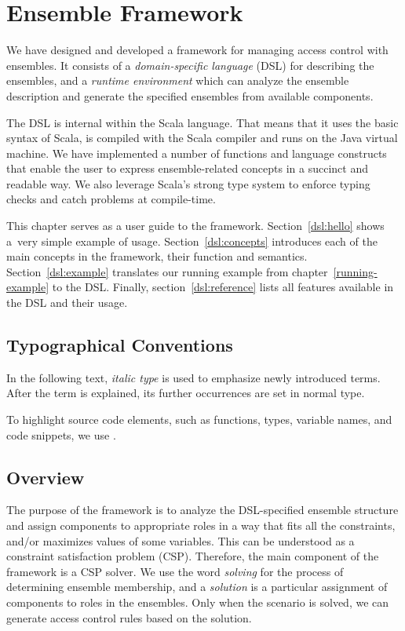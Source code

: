 \chapter{Ensemble Framework}
\label{dsl}

We have designed and developed a framework for managing access control with ensembles.
It consists of a \textit{domain-specific language} (DSL) for describing the ensembles,
and a \textit{runtime environment} which can analyze the ensemble description and
generate the specified ensembles from available components.

The DSL is internal within the Scala language. That means that it uses the basic syntax
of Scala, is compiled with the Scala compiler and runs on the Java virtual machine. We
have implemented a number of functions and language constructs that enable the user to
express ensemble-related concepts in a succinct and readable way. We also leverage
Scala's strong type system to enforce typing checks and catch problems at compile-time.

This chapter serves as a user guide to the framework. Section~\ref{dsl:hello} shows
a~very simple example of usage. Section~\ref{dsl:concepts} introduces each of the main
concepts in the framework, their function and semantics. Section~\ref{dsl:example}
translates our running example from chapter~\ref{running-example} to the DSL. Finally,
section~\ref{dsl:reference} lists all features available in the DSL and their usage.

\section{Typographical Conventions}

In the following text, \textit{italic type} is used to emphasize newly introduced
terms. After the term is explained, its further occurrences are set in normal type.

To highlight source code elements, such as functions, types, variable names, and code
snippets, we use .

\section{Overview}
\label{dsl:overview}

The purpose of the framework is to analyze the DSL-specified ensemble structure and
assign components to appropriate roles in a way that fits all the constraints, and/or
maximizes values of some variables. This can be understood as a constraint satisfaction
problem (CSP). Therefore, the main component of the framework is a CSP solver. We use
the word \textit{solving} for the process of determining ensemble membership, and a
\textit{solution} is a particular assignment of components to roles in the ensembles.
Only when the scenario is solved, we can generate access control rules based on the
solution.

